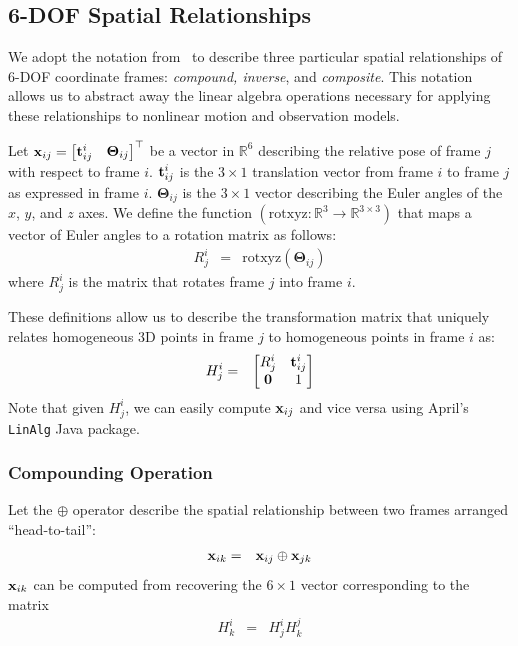 \documentclass[conference]{IEEEtran}
\begin{document}
\subsection{6-DOF Spatial Relationships}
\label{sec:6dof}

We adopt the notation from~\cite{rsmith-1990a,reustice-phdthesis} to
describe three particular spatial relationships of 6-DOF coordinate
frames: {\it compound, inverse}, and {\it composite}.  This notation
allows us to abstract away the linear algebra operations necessary for
applying these relationships to nonlinear motion and observation models.

Let ${\bf x}_{ij} = \begin{bmatrix}
  {\bf t}_{ij}^i & {\boldsymbol \Theta}_{ij}\\
\end{bmatrix}^\top$ be a vector in $\mathbb{R}^6$ describing the
relative pose of frame $j$ with respect to frame $i$.  ${\bf
  t}_{ij}^i$ is the $3\times 1$ translation vector from frame $i$ to
frame $j$ as expressed in frame $i$.  ${\boldsymbol \Theta}_{ij}$ is
the $3 \times 1$ vector describing the Euler angles of the $x$, $y$,
and $z$ axes.  We define the function $(\text{rotxyz}: \mathbb{R}^3
\rightarrow \mathbb{R}^{3\times3})$ that maps a vector of Euler angles to
a rotation matrix as follows:
\begin{eqnarray*}
  R_j^i & = & \text{rotxyz}({\boldsymbol \Theta}_{ij})
\end{eqnarray*}
where $R_j^i$ is the matrix that rotates frame $j$ into frame $i$.

These definitions allow us to describe the transformation matrix
that uniquely relates homogeneous 3D points in frame $j$ to homogeneous
points in frame $i$ as:
\begin{eqnarray*}
  H_{j}^i & = & \begin{bmatrix}
    R_j^i & {\bf t}_{ij}^i\\
    {\bf 0} & 1
  \end{bmatrix}
\end{eqnarray*}
Note that given $H_j^i$, we can easily compute ${\bf x}_{ij}$ and vice
versa using April's \texttt{LinAlg} Java package.

\subsubsection{Compounding Operation}
\label{sub:compoundingoperation}

Let the $\oplus$ operator describe the spatial relationship between
two frames arranged ``head-to-tail'':
\begin{eqnarray*}
  {\bf x}_{ik} & = & {\bf x}_{ij} \oplus {\bf x}_{jk} 
\end{eqnarray*}
${\bf x}_{ik}$ can be computed from recovering the $6 \times 1$ vector
corresponding to the matrix
\begin{eqnarray*}
  H_k^i & = & H_j^i H_k^j
\end{eqnarray*}
\end{document}
